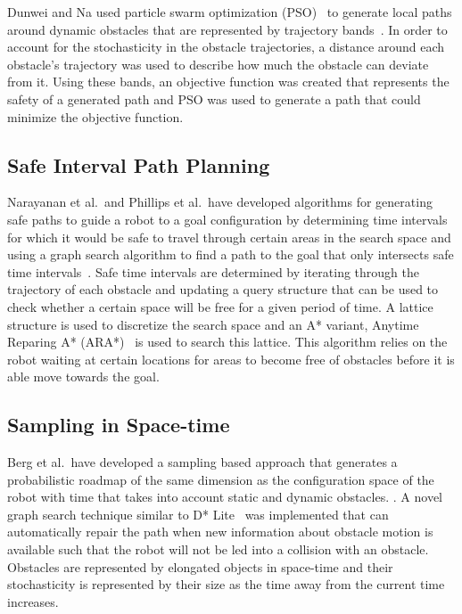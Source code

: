 \documentclass[letterpaper, 10pt, conference]{ieeeconf}
\begin{document}
Dunwei and Na used particle swarm optimization (PSO)~\cite{kennedy2010particle}
to generate local paths around dynamic obstacles that are represented by
trajectory bands~\cite{dunwei2011local}.  In order to account for the
stochasticity in the obstacle trajectories, a distance around each obstacle's
trajectory was used to describe how much the obstacle can deviate from it.
Using these bands, an objective function was created that represents the safety
of a generated path and PSO was used to generate a path that could minimize the
objective function.

\subsection{Safe Interval Path Planning}

Narayanan et al.\ and Phillips et al.\ have developed algorithms for generating
safe paths to guide a robot to a goal configuration by determining time
intervals for which it would be safe to travel through certain areas in the
search space and using a graph search algorithm to find a path to the goal that
only intersects safe time intervals~\cite{asipp, sipp}.  Safe time intervals
are determined by iterating through the trajectory of each obstacle and
updating a query structure that can be used to check whether a certain space
will be free for a given period of time. A lattice structure is used to
discretize the search space and an A* variant, Anytime Reparing A*
(ARA*)~\cite{likhachev2003ara} is used to search this lattice. This algorithm
relies on the robot waiting at certain locations for areas to become free of
obstacles before it is able move towards the goal.

\subsection{Sampling in Space-time}

Berg et al.\ have developed a sampling based approach that generates a
probabilistic roadmap of the same dimension as the configuration space of the
robot with time that takes into account static and dynamic obstacles.
\cite{van2006anytime}. A novel graph search technique similar to D*
Lite~\cite{koenig2002d} was implemented that can automatically repair the path
when new information about obstacle motion is available such that the robot
will not be led into a collision with an obstacle. Obstacles are represented by
elongated objects in space-time and their stochasticity is represented by their
size as the time away from the current time increases.
\end{document}
